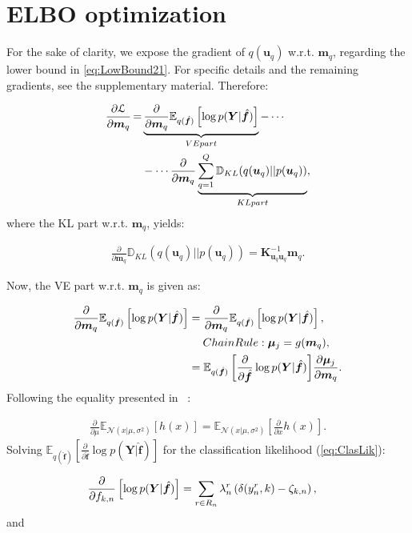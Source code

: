 \documentclass[journal]{IEEEtran}
\providecommand{\ve}[1]{{\bm{#1}}}%
\providecommand{\mat}[1]{{\bm{#1}}} %
\DeclareMathOperator{\igual}{\!\,=\!\,}
\providecommand{\ve}[1]{{\mathbf{#1}}}
\providecommand{\mat}[1]{{\mathbf{#1}}}
\newcommand{\fracpartial}[2]{\frac{\partial #1}{\partial  #2}} %
\newcommand{\gauss}{\mathcal{N}} %
\begin{document}
\section{ELBO optimization}
For the sake of clarity, we expose the gradient of $q(\ve{u}_q)$ w.r.t. $\ve{m}_q$, regarding the lower bound in \cref{eq:LowBound21}. For specific details and the remaining gradients, see the supplementary material. Therefore:


\begin{align}
\notag\fracpartial{\mathcal{L}}{\ve{m}_q} \igual& \underbrace{\fracpartial{}{\ve{m}_q}\mathbb{E}_{q(\hat{\ve{f}})}\left[\log p(\mat{Y}|\hat{\ve{f}})\right]}_{\mbox{VE part}} - \cdots\\
& - \cdots \fracpartial{}{\ve{m}_q}\underbrace{\sum_{q=1}^{Q}\mathbb{D}_{KL}(q(\ve{u}_q)||p(\ve{u}_q))}_{\mbox{KL part}},
\end{align}
where the KL part w.r.t. $\ve{m}_q$, yields:

\begin{align}
\fracpartial{}{\ve{m}_q}{\mathbb{D}_{KL}(q(\ve{u}_q)||p(\ve{u}_q))} = \mat{K}_{\ve{u}_q\ve{u}_q}^{-1}\ve{m}_q.
\end{align}

Now, the VE part w.r.t. $\ve{m}_q$ is given as:

\begin{align}
\notag\fracpartial{}{\ve{m}_q}\mathbb{E}_{q(\hat{\ve{f}})}\left[\log p(\mat{Y}|\hat{\ve{f}})\right] &= \fracpartial{}{\ve{m}_q}\mathbb{E}_{q(\hat{\ve{f}})}\left[\log p(\mat{Y}|\hat{\ve{f}})\right],\\
\notag&\quad\; \mbox{Chain Rule:}\; \bm{\mu}_j=g(\ve{m}_q),\\
&= {\mathbb{E}_{q(\hat{\ve{f}})}\left[\fracpartial{}{\hat{\ve{f}}}\log p(\mat{Y}|\hat{\ve{f}})\right]} \fracpartial{\bm{\mu}_j}{\ve{m}_q}.
\end{align}
Following the equality presented in ~\cite{hensman2015scalable}:

\begin{align}
\fracpartial{}{\mu}\mathbb{E}_{\gauss(x|\mu,\sigma^2)}\left[h(x)\right] = \mathbb{E}_{\gauss(x|\mu,\sigma^2)}\left[\fracpartial{}{x}h(x)\right].
\end{align}
Solving $\mathbb{E}_{q(\hat{\ve{f}})}\left[\fracpartial{}{\hat{\ve{f}}}\log p(\mat{Y}|\hat{\ve{f}})\right]$ for the classification likelihood (\cref{eq:ClasLik}):

\begin{align}
		\notag\fracpartial{}{f_{k,n}}\left[\log p(\mat{Y}|\hat{\ve{f}})\right] &=\sum_{r\in R_n}{\lambda}_n^r\left(\delta(y_n^r,k)-\zeta_{k,n}\right),
\end{align}
and
\end{document}
